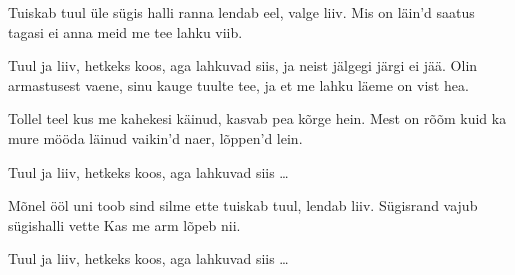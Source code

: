 Tuiskab tuul \"ule s\"ugis halli ranna
lendab eel, valge liiv.
Mis on l\"ain'd saatus tagasi ei anna
meid me tee lahku viib.

Tuul ja liiv, hetkeks koos, aga lahkuvad siis,
ja neist j\"algegi j\"argi ei j\"a\"a.
Olin armastusest vaene, sinu kauge tuulte tee,
ja et me lahku l\"aeme on vist hea.

Tollel teel kus me kahekesi k\"ainud,
kasvab pea k\~orge hein.
Mest on r\~o\~om kuid ka mure m\"o\"oda l\"ainud
vaikin'd naer, l\~oppen'd lein.

Tuul ja liiv, hetkeks koos, aga lahkuvad siis \ldots

M\~onel \"o\"ol uni toob sind silme ette
tuiskab tuul, lendab liiv.
S\"ugisrand vajub s\"ugishalli vette
Kas me arm l\~opeb nii.

Tuul ja liiv, hetkeks koos, aga lahkuvad siis \ldots